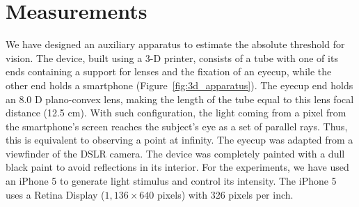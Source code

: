 
\section{Measurements}
\label{sec:Apparatus_and_Measurements}

We have designed an auxiliary apparatus to estimate the absolute threshold for vision. The device, built using a 3-D printer, consists of a tube with one of its ends containing a support for lenses and the fixation of an eyecup, while the other end holds a smartphone (Figure~\ref{fig:3d_apparatus}).    
The eyecup end holds an 8.0 D plano-convex lens, making the length of the tube equal to this lens focal distance (12.5 cm). With such configuration, the light coming from a pixel from the smartphone's screen reaches the subject's eye as a set of parallel rays. Thus,  this is equivalent to observing a point at infinity. 
The eyecup was adapted from a viewfinder of the DSLR camera. The device was completely painted with a dull black paint to avoid reflections in its interior. 
%
For the experiments, we have used an iPhone 5 to generate light stimulus and control its intensity. The iPhone 5 uses a Retina Display
($1,136 \times 640$ pixels) with 326 pixels per inch. 
%
